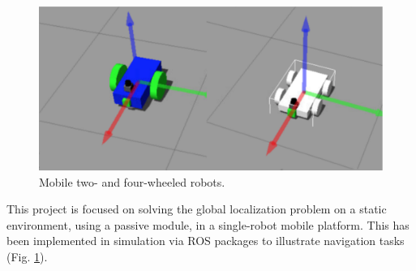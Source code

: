 \documentclass[10pt,journal,compsoc]{IEEEtran}
\begin{document}
\begin{figure}[thpb]
      \centering
      \includegraphics[width=\linewidth]{misc/intro.pdf}
      \caption{Mobile two- and four-wheeled robots.}
      \label{fig:intro}
\end{figure}

This project is focused on solving the global localization problem on a static environment, using a passive module, in a single-robot mobile platform. This has been implemented in simulation via ROS \cite{288} packages to illustrate navigation tasks (Fig. \ref{fig:intro}).  




%
%
%
\end{document}
